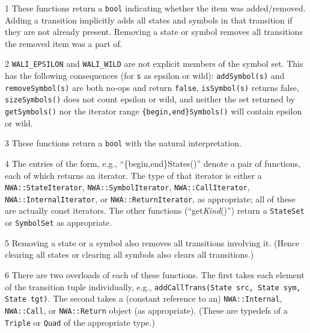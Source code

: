 \begin{sidewaystable}
\begin{threeparttable}
\begin{tabular}{p{0.75in}p{1.55in}p{1.6in}p{1.35in}p{1.27in}p{1.2in}p{1.5in}}
\hline
\end{tabular}
\begin{tablenotes}
  \item[1] These functions return a \texttt{bool} indicating whether the item
    was added/removed. Adding a transition implicitly adds all
    states and symbols in that transition if they are not already present.
    Removing a state or symbol removes all transitions the removed item was a
    part of.
  \item[2] \texttt{WALI\_EPSILON} and \texttt{WALI\_WILD} are not explicit
    members of the symbol set. This has the following consequences (for
    \texttt{s} as epsilon or wild): \texttt{addSymbol(s)} and
    \texttt{removeSymbol(s)} are both no-ops and return \texttt{false},
    \texttt{isSymbol(s)} returns false, \texttt{sizeSymbols()} does not count
    epsilon or wild, and neither the set returned by \texttt{getSymbols()}
    nor the iterator range \texttt{\{begin,end\}Symbols()} will contain
    epsilon or wild.
  \item[3] These functions return a \texttt{bool} with the natural
    interpretation.
  \item[4] The entries of the form, e.g., ``\{begin,end\}States()'' denote a pair
    of functions, each of which returns an iterator. The type of that iterator
    is either a \texttt{NWA::StateIterator},
    \texttt{NWA::SymbolIterator}, \texttt{NWA::CallIterator},
    \texttt{NWA::InternalIterator}, or \texttt{NWA::ReturnIterator}, as appropriate; all of these are
    actually const iterators. The other functions (``get\textit{Kind}()'')
    return a \texttt{StateSet} or \texttt{SymbolSet} as appropriate.
  \item[5] Removing a state or a symbol also removes all transitions
    involving it. (Hence clearing all states or clearing all symbols also
    clears all transitions.)
  \item[6] There are two overloads of each of these functions. The first
    takes each element of the transition tuple individually,
    e.g., \texttt{addCallTrans(State src, State sym, State tgt)}. The
    second takes a (constant reference to an) \texttt{NWA::Internal},
    \texttt{NWA::Call}, or \texttt{NWA::Return} object (as
    appropriate). (These are typedefs of a \texttt{Triple} or \texttt{Quad}
    of the appropriate type.)
\end{tablenotes}
\end{threeparttable}
\end{sidewaystable}
\restoregeometry

